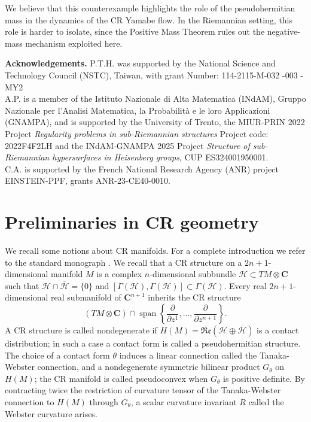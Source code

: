 \documentclass[a4paper,12pt]{amsart}
\newcommand{\de}{\partial}
\newcommand{\C}{\mathbf{C}}
\newcommand{\ci}[1]{\mathscr{#1}}%
\newcommand{\g}[1]{\mathfrak{#1}}
\begin{document}
We believe that this counterexample highlights the role of the
pseudohermitian mass in the dynamics of the CR Yamabe flow. In the
Riemannian setting, this role is harder to isolate, since the Positive
Mass Theorem rules out the negative-mass mechanism exploited here.

\vspace{15pt}

\textbf{Acknowledgements.}
P.T.H. was supported  by the National Science and Technology Council (NSTC),
Taiwan, with grant Number: 114-2115-M-032 -003 -MY2\\
A.P. is a member of the Istituto Nazionale di Alta Matematica (INdAM), Gruppo Nazionale per l'Analisi Matematica, la Probabilità e le loro Applicazioni (GNAMPA), and is supported by the University of Trento, the MIUR-PRIN 2022 Project \emph{Regularity problems in sub-Riemannian structures}  Project code: 2022F4F2LH and the INdAM-GNAMPA 2025 Project \emph{Structure of sub-Riemannian hypersurfaces in Heisenberg groups}, CUP ES324001950001.\\
C.A. is supported by the French National Research Agency (ANR) project  EINSTEIN-PPF, grants ANR-23-CE40-0010.

\section{Preliminaries in CR geometry}\label{Section2}
We recall some notions about CR manifolds. For a complete introduction we refer to the standard monograph \cite{DT}.
We recall that a CR structure on a $2n+1$-dimensional manifold $M$ is a complex $n$-dimensional subbundle $\ci{H}\subset TM\otimes\C$ such that $\ci{H}\cap\overline{\ci{H}}=\{0\}$ and $[\Gamma(\ci{H}),\Gamma(\ci{H})]\subset\Gamma(\ci{H})$.
Every real $2n+1$-dimensional real submanifold of $\C^{n+1}$ inherits the CR structure
$$(TM\otimes\C)\cap\operatorname{span}\left\{\frac{\de}{\de z^1},\ldots,\frac{\de}{\de z^{n+1}}\right\}.$$
A CR structure is called nondegenerate if $H(M)=\g{Re}(\ci{H}\oplus\overline{\ci{H}})$ is a contact distribution; in such a case a contact form is called a pseudohermitian structure. The choice of a contact form $\theta$ induces a linear connection called the Tanaka-Webster connection, and a nondegenerate symmetric bilinear product $G_{\theta}$ on $H(M)$; the CR manifold is called pseudoconvex when $G_{\theta}$ is positive definite. By contracting twice the restriction of curvature tensor of the Tanaka-Webster connection to $H(M)$ through $G_{\theta}$, a scalar curvature invariant $R$ called the Webster curvature arises.
\end{document}

